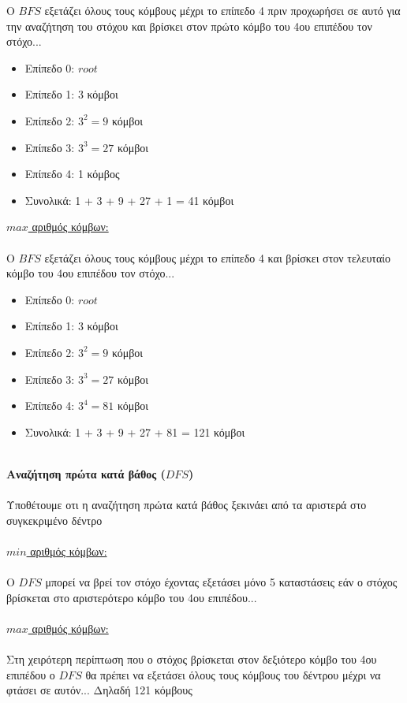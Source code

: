 \documentclass[12pt]{article}
\begin{document}
O $BFS$ εξετάζει όλους τους κόμβους μέχρι το επίπεδο 4 πριν προχωρήσει σε αυτό για την αναζήτηση του στόχου και βρίσκει στον πρώτο κόμβο του 4ου επιπέδου τον στόχο...\\
\begin{itemize}
    \item Επίπεδο 0: $root$
    \item Επίπεδο 1: 3 κόμβοι
    \item Επίπεδο 2: $3^2=9$ κόμβοι
    \item Επίπεδο 3: $3^3=27$ κόμβοι
    \item Επίπεδο 4: 1 κόμβος 
    \item Συνολικά: 1 + 3 + 9 + 27 + 1 = 41 κόμβοι
\end{itemize}
\underline{$max$ αριθμός κόμβων:}\\\\
O $BFS$ εξετάζει όλους τους κόμβους μέχρι το επίπεδο 4 και βρίσκει στον τελευταίο κόμβο του 4ου επιπέδου τον στόχο...\\
\begin{itemize}
    \item Επίπεδο 0: $root$
    \item Επίπεδο 1: 3 κόμβοι
    \item Επίπεδο 2: $3^2=9$ κόμβοι
    \item Επίπεδο 3: $3^3=27$ κόμβοι
    \item Επίπεδο 4: $3^4=81$ κόμβοι 
    \item Συνολικά: 1 + 3 + 9 + 27 + 81 = 121 κόμβοι\\\\
\end{itemize}
\textbf{Αναζήτηση πρώτα κατά βάθος ($DFS$)}\\\\
Υποθέτουμε οτι η αναζήτηση πρώτα κατά βάθος ξεκινάει από τα αριστερά στο συγκεκριμένο δέντρο\\\\
\underline{$min$ αριθμός κόμβων:}\\\\
Ο $DFS$ μπορεί να βρεί τον στόχο έχοντας εξετάσει μόνο 5 καταστάσεις εάν ο στόχος βρίσκεται στο αριστερότερο κόμβο του 4ου επιπέδου...\\\\
\underline{$max$ αριθμός κόμβων:}\\\\
Στη χειρότερη περίπτωση που ο στόχος βρίσκεται στον δεξιότερο κόμβο του 4ου επιπέδου ο $DFS$ θα πρέπει να εξετάσει όλους τους κόμβους του δέντρου μέχρι να φτάσει σε αυτόν... Δηλαδή 121 κόμβους\\\\\\\\\\\\
\end{document}
